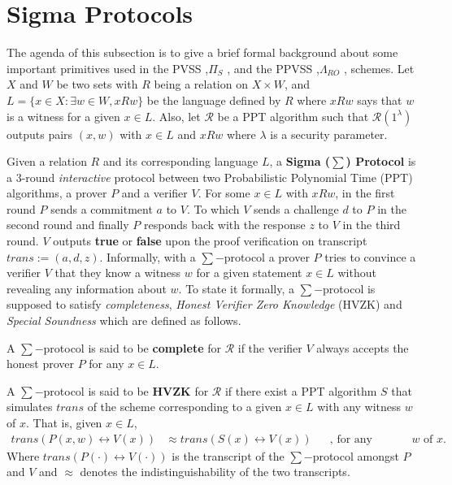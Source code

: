 \section{Sigma Protocols}
\label{sec:sigma-protocols}
The agenda of this subsection is to give a brief formal background about some important primitives 
used in the PVSS ,$\Pi_S$ \cite{cryptoeprint:2023/1669}, and the PPVSS ,$\Lambda_{RO}$ \cite{cryptoeprint:2025/576}, schemes.
Let $X$ and $W$ be two sets with $R$ being a relation on $X\times W$, and $L=\{x\in X :\exists w\in W, xRw\}$
be the language defined by $R$ where $xRw$ says that $w$ is a witness for a given $x\in L$. 
Also, let $\mathcal{R}$ be a PPT algorithm such that $\mathcal{R}(1^\lambda)$ outputs pairs 
$(x,w)$ with $x\in L$ and $xRw$ where $\lambda$ is a security parameter.\par

Given a relation $R$ and its corresponding language $L$, a \textbf{Sigma ($\sum$) Protocol} 
is a $3$-round \textit{interactive} protocol between two Probabilistic Polynomial Time (PPT) algorithms, 
a prover $P$ 
and a verifier $V$. For some $x\in L$ with $xRw$, in the first round $P$ sends a 
commitment $a$ to $V$. To which $V$ sends a challenge $d$ to $P$ in the second round 
and finally $P$ responds back with the response $z$ to $V$ in the third round. 
$V$ outputs \textbf{true} or \textbf{false} upon the proof verification on transcript
$trans := (a, d, z)$. 
Informally, with a $\sum-$protocol a prover $P$ tries to convince
a verifier $V$ that they know a witness $w$ for a given statement $x\in L$ without 
revealing any information about $w$. To state it formally, a $\sum-$protocol is 
supposed to satisfy \textit{completeness}, \textit{Honest Verifier Zero Knowledge} (HVZK)
and \textit{Special Soundness} which are defined as follows.

\begin{definition}[Completeness]
  A $\sum-$protocol is said to be \textbf{complete} for $\mathcal{R}$ if
  the verifier $V$ always accepts the honest prover $P$ for any $x\in L$.
\end{definition}

\begin{definition}[HVZK]
  A $\sum-$protocol is said to be \textbf{HVZK} for $\mathcal{R}$ if there exist a PPT algorithm $S$ 
  that simulates $trans$ of the scheme corresponding to a given $x\in L$ with any witness $w$ of $x$. 
  That is, given $x\in L$,
  \begin{align*}
    trans(P(x,w)\leftrightarrow V(x)) &\approx trans(S(x) \leftrightarrow V(x))&& \text{, for any witness $w$ of $x$.}
  \end{align*}
  Where $trans(P(\cdot)\leftrightarrow V(\cdot))$ is the transcript of the $\sum-$protocol amongst 
  $P$ and $V$ and $\approx$ denotes the indistinguishability of the two transcripts.
\end{definition}

